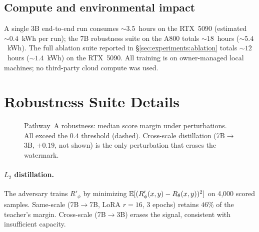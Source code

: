\subsection{Compute and environmental impact}

A single 3B end-to-end run consumes $\sim 3.5$~hours on the RTX~5090
(estimated $\sim 0.4$~kWh per run); the 7B robustness suite on the
A800 totals $\sim 18$~hours ($\sim 5.4$~kWh). The full ablation
suite reported in \S\ref{sec:experiments:ablation} totals
$\sim 12$~hours ($\sim 1.4$~kWh) on the RTX~5090. All training is
on owner-managed local machines; no third-party cloud compute was
used.

\section{Robustness Suite Details}
\label{app:robustness-detail}

\begin{figure}[h]
\centering
{}
\caption{Pathway~A robustness: \verifya{} median score margin
under perturbations. All exceed the $0.4$ threshold (dashed).
Cross-scale distillation (7B$\to$3B, $+0.19$, not shown) is the
only perturbation that erases the watermark.}
\label{fig:robustness-bars}
\end{figure}

\paragraph{$L_2$ distillation.}
The adversary trains $R'_\phi$ by minimizing
$\mathbb{E}[(R'_\phi(x,y) - R_{\theta}(x,y))^2]$ on 4{,}000 scored
samples. Same-scale (7B$\to$7B, LoRA $r{=}16$, 3 epochs) retains
$46\%$ of the teacher's margin. Cross-scale (7B$\to$3B) erases
the signal, consistent with insufficient capacity.

